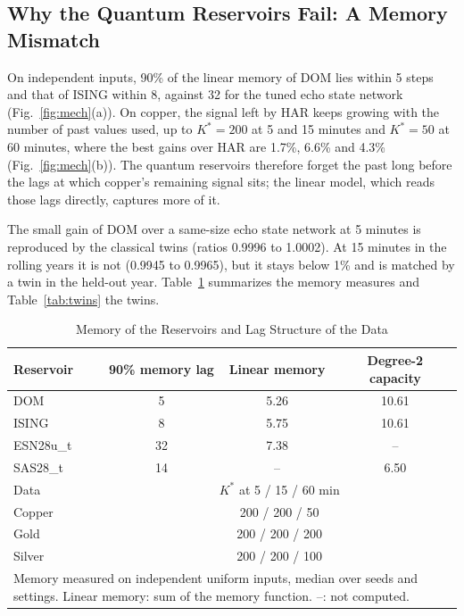 \documentclass{ieeeaccess}
\begin{document}
\subsection{Why the Quantum Reservoirs Fail: A Memory Mismatch}
\label{sec:res-mech}
On independent inputs, 90\% of the linear memory of DOM lies within 5 steps and that of ISING within 8, against 32 for the tuned echo state network (Fig.~\ref{fig:mech}(a)). On copper, the signal left by HAR keeps growing with the number of past values used, up to $K^*=200$ at 5 and 15 minutes and $K^*=50$ at 60 minutes, where the best gains over HAR are 1.7\%, 6.6\% and 4.3\% (Fig.~\ref{fig:mech}(b)). The quantum reservoirs therefore forget the past long before the lags at which copper's remaining signal sits; the linear model, which reads those lags directly, captures more of it.

The small gain of DOM over a same-size echo state network at 5 minutes is reproduced by the classical twins (ratios 0.9996 to 1.0002). At 15 minutes in the rolling years it is not (0.9945 to 0.9965), but it stays below 1\% and is matched by a twin in the held-out year. Table~\ref{tab:memory} summarizes the memory measures and Table~\ref{tab:twins} the twins.

\begin{table}[t]
\caption{Memory of the Reservoirs and Lag Structure of the Data}
\label{tab:memory}
\centering
\begin{tabular}{lccc}
\hline
Reservoir & 90\% memory lag & Linear memory & Degree-2 capacity \\
\hline
DOM & 5 & 5.26 & 10.61 \\
ISING & 8 & 5.75 & 10.61 \\
ESN28u\_t & 32 & 7.38 & -- \\
SAS28\_t & 14 & -- & 6.50 \\
\hline
Data & \multicolumn{3}{c}{$K^*$ at 5 / 15 / 60 min} \\
\hline
Copper & \multicolumn{3}{c}{200 / 200 / 50} \\
Gold & \multicolumn{3}{c}{200 / 200 / 200} \\
Silver & \multicolumn{3}{c}{200 / 200 / 100} \\
\hline
\multicolumn{4}{p{7.6cm}}{\footnotesize Memory measured on independent uniform inputs, median over seeds and settings. Linear memory: sum of the memory function. --: not computed.}\\
\end{tabular}
\end{table}
\end{document}
